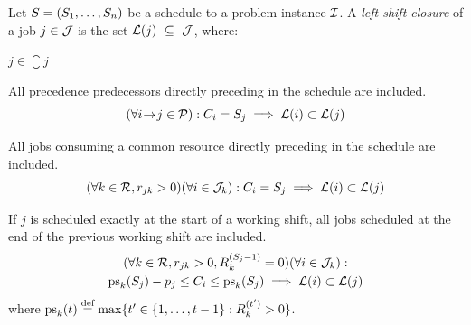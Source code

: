 \begin{defn} \label{def:left-shift-closure}
    Let $S = (S_{1}, \dots, S_{n})$ be a schedule to a problem instance $\mathcal{I}$.
    A \emph{left-shift closure} of a job $j \in \mathcal{J}$ is the set $\mathcal{L}(j)~\subseteq~\mathcal{J}$, where:
    \begin{conditions}
        \item
            $j \in \closure{j}$ \label{def:closure/base}

        \item
            All precedence predecessors directly preceding in the schedule are included.
            $$
            (\forall i \hspace{-0.2em} \rightarrow \hspace{-0.2em} j \in \mathcal{P}):
            C_{i} = S_{j} \implies \mathcal{L}(i) \subset \mathcal{L}(j)
            $$ \label{def:closure/precedence}
            \vspace{-2em}

        \item
            All jobs consuming a common resource directly preceding in the schedule are included.
            $$
            (\forall k \in \mathcal{R}, r_{j k} > 0)
            (\forall i \in \mathcal{J}_{k}):
            C_{i} = S_{j} \implies \mathcal{L}(i) \subset \mathcal{L}(j)
            $$ \label{def:closure/resource-precedence}
            \vspace{-2em}

        \item
            If $j$ is scheduled exactly at the start of a working shift,
            all jobs scheduled at the end of the previous working shift are included.
            \begin{multline*}
            (\forall k \in \Resources, \consumption{j}{k} > 0, \capacity{k}{\jobstart{j}-1} = 0)
            (\forall i \in \JobsOnResource{k}):
            \\
            \mathrm{ps}_k(\jobstart{j}) - \duration{j} \leq \jobend{i} \leq \mathrm{ps}_k(\jobstart{j})
            \implies \closure{i} \subset \closure{j}
            \end{multline*} \label{def:closure/shift-pause-precedence}
            where $\mathrm{ps}_k(t) \defeq \max\{t^\prime \in \intinterval{1}{t-1} : \capacity{k}{t^\prime} > 0\}$.
    \end{conditions}
\end{defn}

